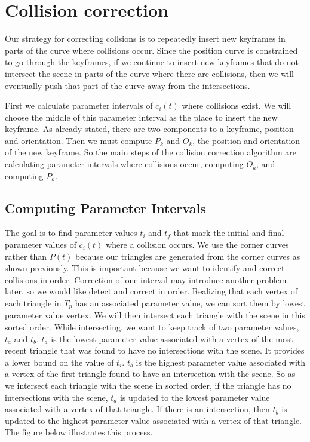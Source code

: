 \section{Collision correction}
Our strategy for correcting collsions is to repeatedly insert new keyframes in
parts of the curve where collisions occur.
Since the position curve is constrained to go through the keyframes, if we 
continue to insert new keyframes that do not intersect the scene in parts of
the curve where there are collisions, then we will eventually push that part
of the curve away from the intersections.

First we calculate parameter intervals of $c_{i}(t)$ where collisions exist.
We will choose the middle of this parameter interval as the place to insert
the new keyframe.
As already stated, there are two components to a keyframe, position and 
orientation.
Then we must compute $P_{k}$ and $O_{k}$, the position and orientation of the
new keyframe.
So the main steps of the collision correction algorithm are calculating
parameter intervals where collisions occur, computing $O_{k}$, and computing
$P_{k}$.

\subsection{Computing Parameter Intervals}
The goal is to find parameter values $t_{i}$ and $t_{f}$ that mark the initial
and final parameter values of $c_{i}(t)$ where a collision occurs.
We use the corner curves rather than $P(t)$ because our triangles are
generated from the corner curves as shown previously.
This is important because we want to identify and correct collisions in order.
Correction of one interval may introduce another problem later, so we would
like detect and correct in order.
Realizing that each vertex of each triangle in $T_{p}$ has an associated
parameter value, we can sort them by lowest parameter value vertex.
We will then intersect each triangle with the scene in this sorted order.
While intersecting, we want to keep track of two parameter values, $t_{a}$ and
$t_{b}$.
$t_{a}$ is the lowest parameter value associated with a vertex of the most
recent triangle that was found to have no intersections with the scene.
It provides a lower bound on the value of $t_{i}$.
$t_{b}$ is the highest parameter value associated with a vertex of the first
triangle found to have an intersection with the scene.
So as we intersect each triangle with the scene in sorted order, if the
triangle has no intersections with the scene, $t_{a}$ is updated to the
lowest parameter value associated with a vertex of that triangle.
If there is an intersection, then $t_{b}$ is updated to the highest parameter
value associated with a vertex of that triangle.
The figure below illustrates this process.

